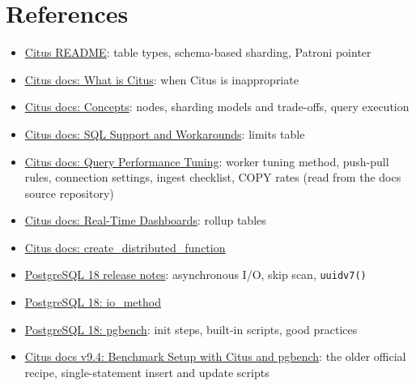 \section*{References}
\begin{itemize}
\item \href{https://github.com/citusdata/citus}{Citus README}: table types, schema-based sharding, Patroni pointer
\item \href{https://docs.citusdata.com/en/stable/get_started/what_is_citus.html}{Citus docs: What is Citus}: when Citus is inappropriate
\item \href{https://docs.citusdata.com/en/stable/get_started/concepts.html}{Citus docs: Concepts}: nodes, sharding models and trade-offs, query execution
\item \href{https://docs.citusdata.com/en/stable/develop/reference_workarounds.html}{Citus docs: SQL Support and Workarounds}: limits table
\item \href{https://docs.citusdata.com/en/stable/performance/performance_tuning.html}{Citus docs: Query Performance Tuning}: worker tuning method, push-pull rules, connection settings, ingest checklist, COPY rates (read from the docs source repository)
\item \href{https://docs.citusdata.com/en/stable/use_cases/realtime_analytics.html}{Citus docs: Real-Time Dashboards}: rollup tables
\item \href{https://docs.citusdata.com/en/stable/develop/api_udf.html\#create-distributed-function}{Citus docs: create\_distributed\_function}
\item \href{https://www.postgresql.org/docs/18/release-18.html}{PostgreSQL 18 release notes}: asynchronous I/O, skip scan, \texttt{uuidv7()}
\item \href{https://www.postgresql.org/docs/18/runtime-config-resource.html}{PostgreSQL 18: io\_method}
\item \href{https://www.postgresql.org/docs/18/pgbench.html}{PostgreSQL 18: pgbench}: init steps, built-in scripts, good practices
\item \href{https://docs.citusdata.com/en/v9.4/extra/write_throughput_benchmark.html}{Citus docs v9.4: Benchmark Setup with Citus and pgbench}: the older official recipe, single-statement insert and update scripts
\end{itemize}
